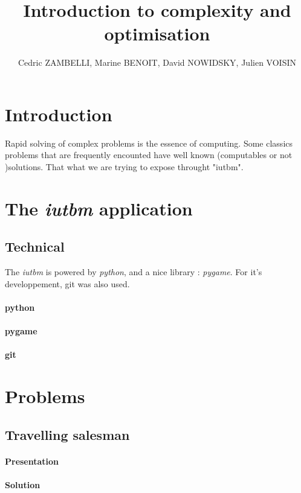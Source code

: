 \documentclass[a4paper, 11pt]{article}
\title{Introduction to complexity and optimisation}
\author{Cedric ZAMBELLI, Marine BENOIT, David NOWIDSKY, Julien VOISIN}
\begin{document}
	\maketitle

	\section*{Introduction}
        Rapid solving of complex problems is the essence of computing.
        Some classics problems that are frequently encounted
        have well known (computables or not )solutions.
        That what we are trying to expose throught "iutbm".

    \section{The \emph{iutbm} application}
        \subsection{Technical}
            The \emph{iutbm} is powered by \emph{python},
            and a nice library : \emph{pygame}.
            For it's developpement, git was also used.
            \paragraph{python}
            \paragraph{pygame}
            \paragraph{git}

    \section{Problems}
        \subsection{Travelling salesman}
            \paragraph{Presentation}
            \paragraph{Solution}
\end{document}
